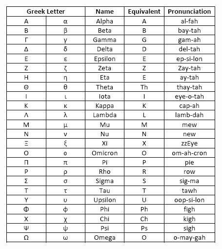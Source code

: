 \documentclass[oneside]{article}
\begin{document}
\includegraphics{apha.png}








\end{document}
